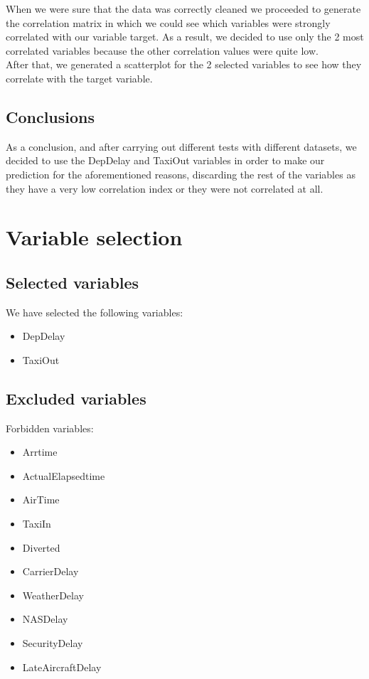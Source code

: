 When we were sure that the data was correctly cleaned we proceeded to generate the correlation matrix in which we could see which variables were strongly correlated with our variable target. As a result, we decided to use only the 2 most correlated variables because the other correlation values were quite low.\\


After that, we generated a scatterplot for the 2 selected variables to see how they correlate with the target variable.


\subsection{Conclusions}
As a conclusion, and after carrying out different tests with different datasets, we decided to use the DepDelay and TaxiOut variables in order to make our prediction for the aforementioned reasons, discarding the rest of the variables as they have a very low correlation index or they were not correlated at all.

\section{Variable selection}

\subsection{Selected variables}
We have selected the following variables:

\begin{itemize}
	\item DepDelay
	\item TaxiOut
\end{itemize}

\subsection{Excluded variables}
Forbidden variables:

\begin{itemize}
	\item Arrtime
	\item ActualElapsedtime
	\item AirTime
	\item TaxiIn
	\item Diverted
	\item CarrierDelay
	\item WeatherDelay
	\item NASDelay
	\item SecurityDelay
	\item LateAircraftDelay
\end{itemize}

